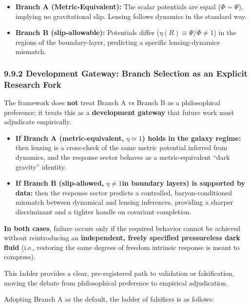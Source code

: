 \documentclass[11pt]{article}
\begin{document}
\begin{itemize}
\item
  \textbf{Branch A (Metric-Equivalent):} The scalar potentials are equal (\(\Phi = \Psi\)), implying no gravitational slip. Lensing follows dynamics in the standard way.
\item
  \textbf{Branch B (slip-allowable):} Potentials differ (\(\eta(R) \equiv \Psi\text{/}\Phi \neq 1\)) in the regions of the boundary-layer, predicting a specific lensing-dynamics mismatch.
\end{itemize}

\subsubsection{9.9.2 Development Gateway: Branch Selection as an Explicit Research Fork}\label{development-gateway-branch-selection-as-an-explicit-research-fork}

The framework does \textbf{not} treat Branch A vs Branch B as a philosophical preference; it treats this as a \textbf{development gateway} that future work must adjudicate empirically.

\begin{itemize}
\item
  \textbf{If Branch A (metric-equivalent,} \(\eta \simeq 1\)\textbf{) holds in the galaxy regime:} then lensing is a cross-check of the same metric potential inferred from dynamics, and the response sector behaves as a metric-equivalent ``dark gravity'' identity.
\item
  \textbf{If Branch B (slip-allowed,} \(\eta \neq 1\)\textbf{in boundary layers) is supported by data:} then the response sector predicts a controlled, baryon-conditioned mismatch between dynamical and lensing inferences, providing a sharper discriminant and a tighter handle on covariant completion.
\end{itemize}

\textbf{In both cases}, failure occurs only if the required behavior cannot be achieved without reintroducing an \textbf{independent, freely specified pressureless dark fluid} (i.e., restoring the same degrees of freedom intrinsic response is meant to compress).

This ladder provides a clear, pre-registered path to validation or falsification, moving the debate from philosophical preference to empirical adjudication.

Adopting Branch A as the default, the ladder of falsifiers is as follows:
\end{document}
